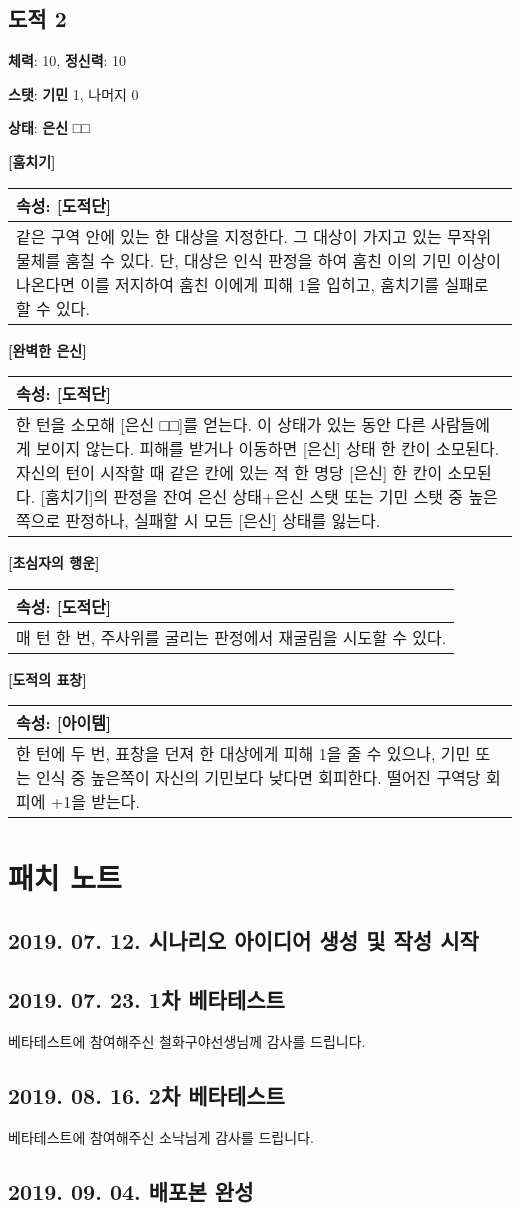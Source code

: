 \documentclass[12pt]{report}
\newenvironment{story}[2]
{\begin{center}
		{\large \textbf{[#1]}}\\[1ex]
		\begin{tabular}{|p{\textwidth}|}
			\hline
			\textbf{속성}: #2
			\\
			\hline
		}
		{
			\\\hline
		\end{tabular}
	\end{center}
}
\begin{document}
		\section*{도적 2}
		\textbf{체력}: 10, \textbf{정신력}: 10
		
		\textbf{스탯}: \textbf{기민} 1, 나머지 0
		
		\textbf{상태}: \textbf{은신} □□
		
		\begin{story}{훔치기}{[도적단]}
			같은 구역 안에 있는 한 대상을 지정한다. 그 대상이 가지고 있는 무작위 물체를 훔칠 수 있다. 단, 대상은 인식 판정을 하여 훔친 이의 기민 이상이 나온다면 이를 저지하여 훔친 이에게 피해 1을 입히고, 훔치기를 실패로 할 수 있다.
		\end{story}
		
		\begin{story}{완벽한 은신}{[도적단]}
			한 턴을 소모해 [은신 □□]를 얻는다. 이 상태가 있는 동안 다른 사람들에게 보이지 않는다. 피해를 받거나 이동하면 [은신] 상태 한 칸이 소모된다. 자신의 턴이 시작할 때 같은 칸에 있는 적 한 명당 [은신] 한 칸이 소모된다. [훔치기]의 판정을 잔여 은신 상태+은신 스탯 또는 기민 스탯 중 높은 쪽으로 판정하나, 실패할 시 모든 [은신] 상태를 잃는다.
		\end{story}
		
		\begin{story}{초심자의 행운}{[도적단]}
			매 턴 한 번, 주사위를 굴리는 판정에서 재굴림을 시도할 수 있다.
		\end{story}
		
		\begin{story}{도적의 표창}{[아이템]}
			한 턴에 두 번, 표창을 던져 한 대상에게 피해 1을 줄 수 있으나, 기민 또는 인식 중 높은쪽이 자신의 기민보다 낮다면 회피한다. 떨어진 구역당 회피에 +1을 받는다.
		\end{story}
		
	\chapter{패치 노트}
	
	\section*{2019. 07. 12. 시나리오 아이디어 생성 및 작성 시작}
	
	\section*{2019. 07. 23. 1차 베타테스트}
		베타테스트에 참여해주신 철화구야선생님께 감사를 드립니다.
	
	\section*{2019. 08. 16. 2차 베타테스트}
		베타테스트에 참여해주신 소낙님게 감사를 드립니다.
		
	\section*{2019. 09. 04. 배포본 완성}
	
\end{document}
